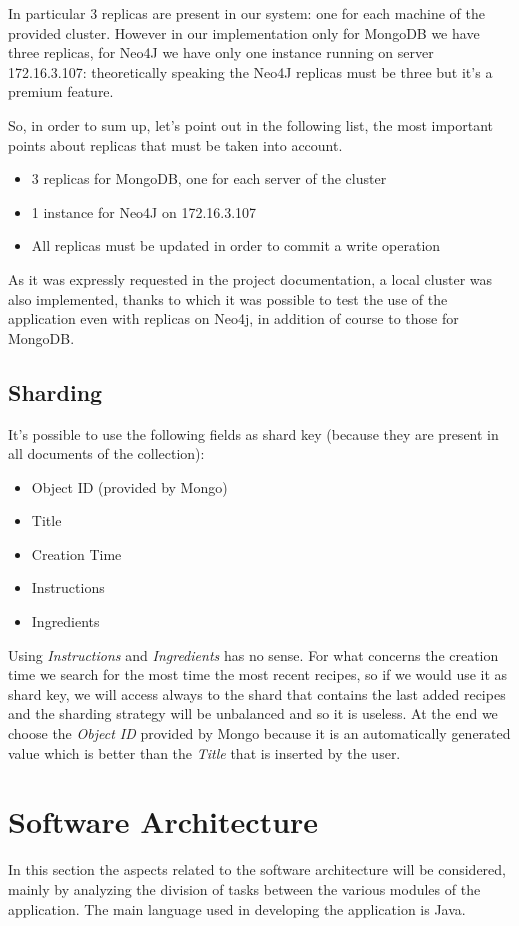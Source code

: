\documentclass[a4paper]{report}
\begin{document}
\noindent \noindent In particular 3 replicas are present in our system: one for each machine of the provided cluster. However in our implementation only for MongoDB we have three replicas, for Neo4J we have only one instance running on server 172.16.3.107: theoretically speaking the Neo4J replicas must be three but it's a premium feature.

\noindent So, in order to sum up, let's point out in the following list, the most important points about replicas that must be taken into account.
\begin{itemize}
	\item 3 replicas for MongoDB, one for each server of the cluster
	\item 1 instance for Neo4J on 172.16.3.107
	\item All replicas must be updated in order to commit a write operation
\end{itemize}

\noindent As it was expressly requested in the project documentation, a local cluster was also implemented, thanks to which it was possible to test the use of the application even with replicas on Neo4j, in addition of course to those for MongoDB.

\subsection{Sharding}
It's possible to use the following fields as shard key (because they are present in all documents of the collection):
\begin{itemize}
	\item Object ID (provided by Mongo)
	\item Title
	\item Creation Time
	\item Instructions
	\item Ingredients
\end{itemize}

\noindent Using \emph{Instructions} and \emph{Ingredients} has no sense. For what concerns the creation time we search for the most time the most recent recipes, so if we would use it as shard key, we will access always to the shard that contains the last added recipes and the sharding strategy will be unbalanced and so it is useless. At the end we choose the \emph{Object ID} provided by Mongo because it is an automatically generated value which is better than the \emph{Title} that is inserted by the user.


\section{Software Architecture}
In this section the aspects related to the software architecture will be considered, mainly by analyzing the division of tasks between the various modules of the application. The main language used in developing the application is Java.
\end{document}
